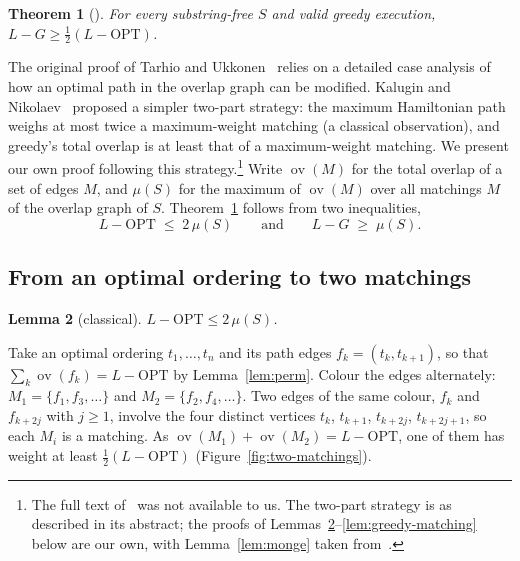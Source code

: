 \documentclass[11pt,a4paper]{article}   %
\makeatletter
\renewenvironment{proof}[1][\proofname]{\par
  \pushQED{\qed}%
  \normalfont \topsep1\p@\@plus1\p@\relax
  \trivlist
  \item[\hskip\labelsep\itshape #1\@addpunct{.}]\ignorespaces
}{\popQED\endtrivlist\@endpefalse}
\theoremstyle{compact}
\newtheorem{theorem}{Theorem}[section]
\newtheorem{lemma}[theorem]{Lemma}
\theoremstyle{compactdef}
\newcommand{\OPT}{\mathrm{OPT}}
\newcommand{\GR}{G}                         %
\newcommand{\ov}{\operatorname{ov}}         %
\makeatother
\begin{document}
\begin{theorem}[\cite{TU88,Tur89}]\label{thm:half}
For every substring-free $S$ and valid greedy execution,
$L-\GR \ge \frac12 (L-\OPT)$.
\end{theorem}
 
The original proof of Tarhio and Ukkonen~\cite{TU88} relies on a detailed
case analysis of how an optimal path in the overlap graph can be modified.
Kalugin and Nikolaev~\cite{KN24} proposed a simpler two-part strategy: the
maximum Hamiltonian path weighs at most twice a maximum-weight matching (a
classical observation), and greedy's total overlap is at least that of a
maximum-weight matching. We present our own proof following this
strategy.\footnote{The full text of~\cite{KN24} was not available to us.
The two-part strategy is as described in its abstract; the proofs of
Lemmas~\ref{lem:two-matchings}--\ref{lem:greedy-matching} below are our
own, with Lemma~\ref{lem:monge} taken from~\cite{TU88}.} Write $\ov(M)$ for the total overlap of a set of edges $M$, and $\mu(S)$
for the maximum of $\ov(M)$ over all matchings $M$ of the overlap graph of
$S$. Theorem~\ref{thm:half} follows from two inequalities,
\[
  L-\OPT \;\le\; 2\,\mu(S) \qquad\text{and}\qquad L-\GR \;\ge\; \mu(S).
\]
 
\subsection{From an optimal ordering to two matchings}
 
\begin{lemma}[classical]\label{lem:two-matchings}
$L-\OPT\le 2\,\mu(S)$.
\end{lemma}
 
\begin{proof}
Take an optimal ordering $t_1,\dots,t_n$ and its path edges
$f_k=(t_k,t_{k+1})$, so that $\sum_k\ov(f_k)=L-\OPT$ by
Lemma~\ref{lem:perm}. Colour the edges alternately: $M_1=\{f_1,f_3,\dots\}$
and $M_2=\{f_2,f_4,\dots\}$. Two edges of the same colour, $f_k$ and
$f_{k+2j}$ with $j\ge1$, involve the four distinct vertices $t_k$,
$t_{k+1}$, $t_{k+2j}$, $t_{k+2j+1}$, so each $M_i$ is a matching. As
$\ov(M_1)+\ov(M_2)=L-\OPT$, one of them has weight at least
$\frac12(L-\OPT)$ (Figure~\ref{fig:two-matchings}).
\end{proof}
\end{document}
